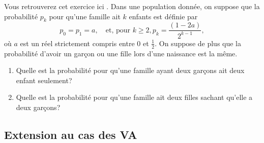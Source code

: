 \documentclass[11pt, a4paper]{article}
\begin{document}
\begin{question}
  Vous retrouverez cet exercice ici \cite[Exercice
  4.3]{ouvrard1998probabilites}. Dans une population donnée, on
  suppose que la probabilité $p_k$ pour qu'une famille ait $k$ enfants
  est définie par
  \[
    p_0 = p_1 = a, \quad \textrm{et, pour } k \geq 2, p_k =
    \frac{(1-2a)}{2^{k-1}},
  \]
  où $a$ est un réel strictement compris entre $0$ et
  $\frac{1}{2}$. On suppose de plus que la probabilité d'avoir un
  gar\c{c}on ou une fille lors d'une naissance est la même.
  \begin{enumerate}
  \item Quelle est la probabilité pour qu'une famille ayant deux
    gar\c{c}ons ait deux enfant seulement?
  \item Quelle est la probabilité pour qu'une famille ait deux filles
    sachant qu'elle a deux gar\c{c}ons?
  \end{enumerate}
\end{question}

\subsection{Extension au cas des VA}
\label{sec:extVA}
\end{document}
